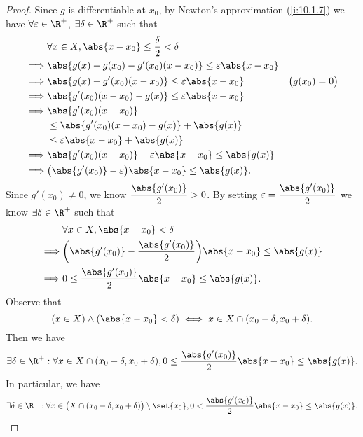 \begin{proof}
  Since \(g\) is differentiable at \(x_0\), by Newton's approximation (\cref{i:10.1.7}) we have \(\forall \varepsilon \in \R^+\), \(\exists \delta \in \R^+\) such that
  \begin{align*}
             & \forall x \in X, \abs{x - x_0} \leq \dfrac{\delta}{2} < \delta                               \\
    \implies & \abs{g(x) - g(x_0) - g'(x_0)(x - x_0)} \leq \varepsilon \abs{x - x_0}                        \\
    \implies & \abs{g(x) - g'(x_0)(x - x_0)} \leq \varepsilon \abs{x - x_0}          & \big(g(x_0) = 0\big) \\
    \implies & \abs{g'(x_0)(x - x_0) - g(x)} \leq \varepsilon \abs{x - x_0}                                 \\
    \implies & \abs{g'(x_0)(x - x_0)}                                                                       \\
             & \leq \abs{g'(x_0)(x - x_0) - g(x)} + \abs{g(x)}                                              \\
             & \leq \varepsilon \abs{x - x_0} + \abs{g(x)}                                                  \\
    \implies & \abs{g'(x_0)(x - x_0)} - \varepsilon \abs{x - x_0} \leq \abs{g(x)}                           \\
    \implies & \big(\abs{g'(x_0)} - \varepsilon\big)\abs{x - x_0} \leq \abs{g(x)}.
  \end{align*}
  Since \(g'(x_0) \neq 0\), we know \(\dfrac{\abs{g'(x_0)}}{2} > 0\).
  By setting \(\varepsilon = \dfrac{\abs{g'(x_0)}}{2}\) we know \(\exists \delta \in \R^+\) such that
  \begin{align*}
             & \forall x \in X, \abs{x - x_0} < \delta                                            \\
    \implies & \bigg(\abs{g'(x_0)} - \dfrac{\abs{g'(x_0)}}{2}\bigg) \abs{x - x_0} \leq \abs{g(x)} \\
    \implies & 0 \leq \dfrac{\abs{g'(x_0)}}{2} \abs{x - x_0} \leq \abs{g(x)}.
  \end{align*}
  Observe that
  \[
    (x \in X) \land (\abs{x - x_0} < \delta) \iff x \in X \cap (x_0 - \delta, x_0 + \delta).
  \]
  Then we have
  \[
    \exists \delta \in \R^+ : \forall x \in X \cap (x_0 - \delta, x_0 + \delta), 0 \leq \dfrac{\abs{g'(x_0)}}{2} \abs{x - x_0} \leq \abs{g(x)}.
  \]
  In particular, we have
  \[
    \exists \delta \in \R^+ : \forall x \in \big(X \cap (x_0 - \delta, x_0 + \delta)\big) \setminus \set{x_0}, 0 < \dfrac{\abs{g'(x_0)}}{2} \abs{x - x_0} \leq \abs{g(x)}.
\]
\end{proof}
